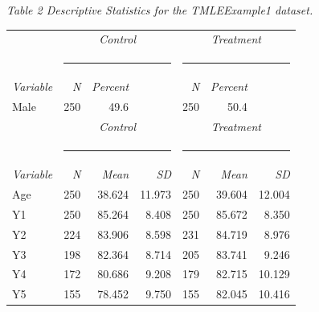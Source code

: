 \documentclass[10pt]{article}
\renewcommand{\baselinestretch}{1.3}
\begin{document}
\hspace{0.6in}\begin{minipage}[t]{6.8in}
{\renewcommand{\baselinestretch}{1.0}\selectfont%
\begin{minipage}[t]{5.6in}
{\normalsize \em Table 2  Descriptive Statistics for the TMLEExample1 dataset.}
\end{minipage}}\vspace{-0.01in}

{\renewcommand{\baselinestretch}{1.0}\selectfont\normalsize\selectfont%
\begin{tabular}[l]{l@{\hspace{0.45in}}rrr@{\hspace{0.45in}}rrr}\hline
   \multicolumn{1}{c}{~} & 
   \multicolumn{3}{c}{\hspace{-0.45in} \em Control} & 
   \multicolumn{3}{c}{\em Treatment} \\[-0.15in]
   \multicolumn{1}{c}{~} & 
   \multicolumn{3}{c}{\hspace{-0.45in}\rule[0.0in]{1.4in}{0.01in}} & 
   \multicolumn{3}{c}{\hspace{-0.12in}\rule[0.0in]{1.4in}{0.01in}} \\[-0.05in]
   \multicolumn{1}{l}{\em Variable} & 
   \multicolumn{1}{r}{\em N} & 
   \multicolumn{1}{r}{\em Percent} &
   \multicolumn{1}{r}{~} & 
   \multicolumn{1}{r}{\em N} & 
   \multicolumn{1}{r}{\em Percent} &
   \multicolumn{1}{r}{~} 
\\\hline
   Male    &    250  &  49.6       &           &   250  &  50.4     &         \rule[0.0in]{0.0in}{0.2in}
\\[0.05in]
   \multicolumn{1}{c}{~} & 
   \multicolumn{3}{c}{\hspace{-0.45in} \em Control} & 
   \multicolumn{3}{c}{\em Treatment} \\[-0.15in]
   \multicolumn{1}{c}{~} & 
   \multicolumn{3}{c}{\hspace{-0.45in}\rule[0.0in]{1.4in}{0.01in}} & 
   \multicolumn{3}{c}{\hspace{-0.12in}\rule[0.0in]{1.4in}{0.01in}} \\[-0.05in]
   \multicolumn{1}{l}{\em Variable} & 
   \multicolumn{1}{r}{\em N} & 
   \multicolumn{1}{r}{\em Mean} &
   {\em SD} & 
   \multicolumn{1}{r}{\em N } &
   \multicolumn{1}{r}{\em Mean} &
   \multicolumn{1}{r}{\em SD}
\\\hline
\rule[0.0in]{0.0in}{0.2in}Age &     250 &    38.624 &    11.973 &      250 &   39.604 &  12.004 \\[0.05in]
    Y1 &     250 &    85.264 &     8.408 &      250 &   85.672 &   8.350\\
    Y2 &     224 &    83.906 &     8.598 &      231 &   84.719 &   8.976\\
    Y3 &     198 &    82.364 &     8.714 &      205 &   83.741 &   9.246\\
    Y4 &     172 &    80.686 &     9.208 &      179 &   82.715 &  10.129\\
    Y5 &     155 &    78.452 &     9.750 &      155 &   82.045 &  10.416   
\\\hline
\end{tabular}}
\end{minipage}
\vspace{-0.01in}
\end{document}

